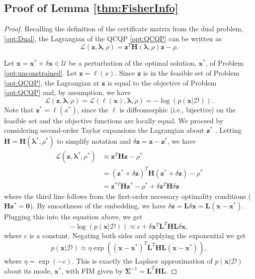 \documentclass[lettersize,journal]{IEEEtran}
\begin{document}
\subsection{Proof of Lemma \ref{thm:FisherInfo}}\label{SM:lemma1Proof}
\begin{proof}
Recalling the definition of the certificate matrix from the dual problem, \eqref{opt:Dual}, the Lagrangian of the QCQP \eqref{opt:QCQP} can be written as
\begin{equation*}
	\mathcal{L}(\bm{z},\bm{\lambda}, \rho) = \bm{z}^T \bm{H}(\bm{\lambda}, \rho) \bm{z} - \rho.
\end{equation*}

Let $\bm{x} = \bm{x}^*+\delta\bm{x} \in \mathcal{U}$ be a perturbation of the optimal solution, $\bm{x}^*$, of Problem \eqref{opt:unconstrained}. Let $\bm{z}= \bm{\ell}(x)$. Since $\bm{z}$ is in the feasible set of Problem \eqref{opt:QCQP}, the Lagrangian at $\bm{z}$ is equal to the objective of Problem \eqref{opt:QCQP} and, by assumption, we have
\begin{equation*}
	\mathcal{L}(\bm{z},\bm{\lambda}, \rho)=\mathcal{L}(\bm{\ell}(\bm{x}),\bm{\lambda}, \rho) = -\log(p(\bm{x} \vert \bm{\mathcal{D}})).
\end{equation*}
Note that $\bm{z}^* = \bm{\ell}(x^*)$, since the $\bm{\ell}$ is diffeomorphic (i.e., bijective) on the feasible set and the objective functions are locally equal. We proceed by considering second-order Taylor expansions the Lagrangian about $\bm{z}^*$ \cite[Theorem 12.5]{nocedalNumericalOptimization2006}. Letting  $\bm{H}= \bm{H}(\bm{\lambda}^*, \rho^*)$ to simplify notation and $\delta\bm{z} = \bm{z} - \bm{z}^*$, we have
\begin{align*}
	\mathcal{L}(\bm{z},\bm{\lambda}^*, \rho^*) &\approx \bm{z}^T \bm{H} \bm{z} - \rho^* \\ 
	&= (\bm{z}^*+\delta\bm{z})^T \bm{H} (\bm{z}^*+\delta\bm{z}) - \rho^* \\ 
	&= \bm{z}^{*T} \bm{H}\bm{z}^{*} -\rho^* + \delta\bm{z}^T \bm{H}\delta\bm{z}
\end{align*}
where the third line follows from the first-order necessary optimality conditions ($\bm{H} \bm{z}^*=\bm{0}$). By smoothness of the embedding, we have $\delta\bm{z} = \bm{L} \delta\bm{x} = \bm{L}(\bm{x}-\bm{x}^*)$. Plugging this into the equation above, we get
\begin{equation*}
	-\log(p(\bm{x} \vert \bm{\mathcal{D}})) \approx c + \delta\bm{x}^T \bm{L}^T\bm{H}\bm{L}\delta\bm{x},
\end{equation*}
where $c$ is a constant. Negating both sides and applying the exponential we get
\begin{equation*}
	p(\bm{x} \vert \bm{\mathcal{D}}) \approx \eta\exp\left((\bm{x}-\bm{x}^*)^T \bm{L}^T\bm{H}\bm{L}(\bm{x}-\bm{x}^*)\right),
\end{equation*}
where $\eta = \exp(-c)$. This is exactly the Laplace approximation of $p(\bm{x} \vert \bm{\mathcal{D}})$ about its mode, $\bm{x}^*$, with FIM given by $\bm{\Sigma}^{-1} = \bm{L}^T\bm{H}\bm{L}$.
\end{proof}
\end{document}
